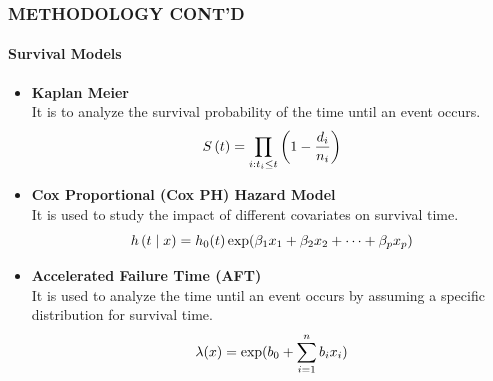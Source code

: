 \documentclass[12pt]{beamer}
\begin{document}
\begin{frame}


		\frametitle{METHODOLOGY CONT'D}
      \framesubtitle{Survival Models}  

		\begin{itemize}
            \item  \textbf{Kaplan Meier }\\
It is to analyze the survival probability of the time until an event occurs.
\begin{equation} \scriptsize
S\left(t\right)=\prod_{i:t_i\le t}\left(1-\frac{d_i}{n_i}\right)
\end{equation}
    \item \textbf{Cox Proportional (Cox PH) Hazard Model}\\
  It is used to study the impact of different covariates on survival time.
\begin{equation} \scriptsize
h\left(t \mid x\right) = h_0(t) \exp(\beta_1 x_1 + \beta_2 x_2 + \cdots + \beta_p x_p)
\end{equation}

    \item \textbf{Accelerated Failure Time (AFT)}\\
 It is used to analyze the time until an event occurs by assuming a specific distribution for survival time. 
\begin{equation} \scriptsize
\lambda(x) = \exp(b_0 + \sum_{i=1}^{n}{b_i x_i})
\end{equation}


   	\end{itemize}

    \end{frame}
 
\end{document}
